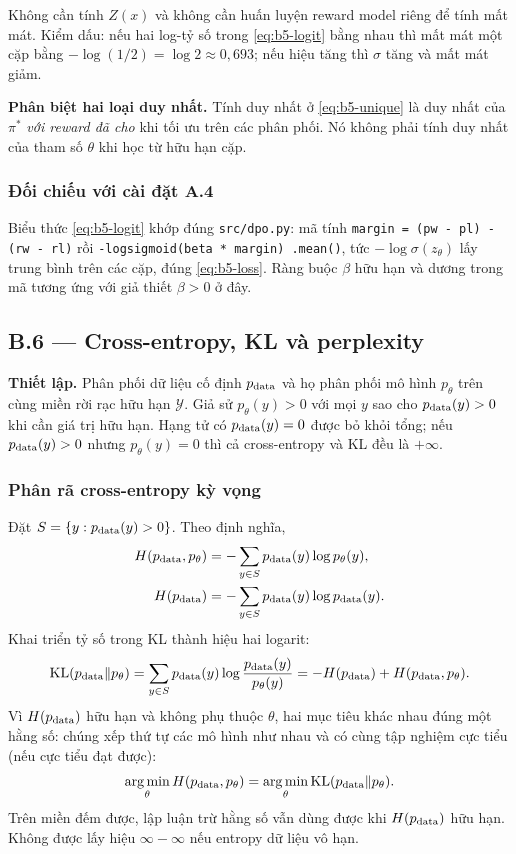 Không cần tính $Z(x)$ và không cần huấn luyện reward model riêng để tính mất mát.
Kiểm dấu: nếu hai log-tỷ số trong \eqref{eq:b5-logit} bằng nhau thì mất mát một cặp
bằng $-\log(1/2)=\log 2\approx0{,}693$; nếu hiệu tăng thì $\sigma$ tăng và mất mát
giảm.

\textbf{Phân biệt hai loại duy nhất.} Tính duy nhất ở \eqref{eq:b5-unique} là duy
nhất của $\pi^*$ \emph{với reward đã cho} khi tối ưu trên các phân phối. Nó không
phải tính duy nhất của tham số $\theta$ khi học từ hữu hạn cặp.

\subsubsection{Đối chiếu với cài đặt A.4}

Biểu thức \eqref{eq:b5-logit} khớp đúng \texttt{src/dpo.py}: mã tính
\texttt{margin = (pw - pl) - (rw - rl)} rồi \texttt{-logsigmoid(beta * margin)
.mean()}, tức $-\log\sigma(z_\theta)$ lấy trung bình trên các cặp, đúng
\eqref{eq:b5-loss}. Ràng buộc $\beta$ hữu hạn và dương trong mã tương ứng với giả
thiết $\beta>0$ ở đây.

\subsection{B.6 --- Cross-entropy, KL và perplexity}
\label{sec:b6}

\textbf{Thiết lập.} Phân phối dữ liệu cố định $p_{\mathrm{data}}$ và họ phân phối mô hình
$p_\theta$ trên cùng miền rời rạc hữu hạn $\mathcal Y$. Giả sử $p_\theta(y)>0$ với
mọi $y$ sao cho $p_{\mathrm{data}}(y)>0$ khi cần giá trị hữu hạn. Hạng tử có $p_{\mathrm{data}}(y)=0$
được bỏ khỏi tổng; nếu $p_{\mathrm{data}}(y)>0$ nhưng $p_\theta(y)=0$ thì cả cross-entropy và
KL đều là $+\infty$.

\subsubsection{Phân rã cross-entropy kỳ vọng}

Đặt $S=\{y:p_{\mathrm{data}}(y)>0\}$. Theo định nghĩa,
\begin{align*}
  H(p_{\mathrm{data}},p_\theta)&=-\sum_{y\in S}p_{\mathrm{data}}(y)\log p_\theta(y),\\
  H(p_{\mathrm{data}})&=-\sum_{y\in S}p_{\mathrm{data}}(y)\log p_{\mathrm{data}}(y).
\end{align*}
Khai triển tỷ số trong KL thành hiệu hai logarit:
\begin{equation}
  \operatorname{KL}(p_{\mathrm{data}}\|p_\theta)
   =\sum_{y\in S}p_{\mathrm{data}}(y)\log\frac{p_{\mathrm{data}}(y)}{p_\theta(y)}
   =-H(p_{\mathrm{data}})+H(p_{\mathrm{data}},p_\theta).
  \label{eq:b6-decomp}
\end{equation}
Vì $H(p_{\mathrm{data}})$ hữu hạn và không phụ thuộc $\theta$, hai mục tiêu khác nhau đúng một
hằng số: chúng xếp thứ tự các mô hình như nhau và có cùng tập nghiệm cực tiểu (nếu
cực tiểu đạt được):
\begin{equation}
  \operatorname*{arg\,min}_\theta H(p_{\mathrm{data}},p_\theta)=\operatorname*{arg\,min}_\theta \operatorname{KL}(p_{\mathrm{data}}\|p_\theta).
  \label{eq:b6-equiv}
\end{equation}
Trên miền đếm được, lập luận trừ hằng số vẫn dùng được khi $H(p_{\mathrm{data}})$ hữu hạn.
Không được lấy hiệu $\infty-\infty$ nếu entropy dữ liệu vô hạn.

